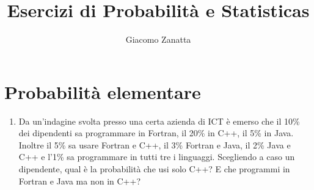 \documentclass{article}
\title{Esercizi di Probabilità e Statisticas}
\author{Giacomo Zanatta}
\begin{document}
\section{Probabilità elementare}
\begin{enumerate}
\item Da un’indagine svolta presso una certa azienda di ICT è emerso che il 10\% dei
dipendenti sa programmare in Fortran, il 20\% in C++, il 5\% in Java. Inoltre il
5\% sa usare Fortran e C++, il 3\% Fortran e Java, il 2\% Java e C++ e l’1\% sa
programmare in tutti tre i linguaggi. Scegliendo a caso un dipendente, qual è la
probabilità che usi solo C++? E che programmi in Fortran e Java ma non in C++? \\

\end{enumerate}
\end{document}
